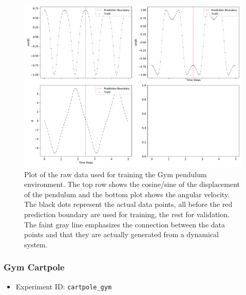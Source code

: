 			\begin{figure}
				\centering
				\includegraphics[width=\linewidth]{figures/experiments/environments/observations-pendulum-gym-N0.pdf}
				\caption{Plot of the raw data used for training the Gym pendulum environment. The top row shows the cosine/sine of the displacement of the pendulum and the bottom plot shows the angular velocity. The black dots represent the actual data points, all before the red prediction boundary are used for training, the rest for validation. The faint gray line emphasizes the connection between the data points and that they are actually generated from a dynamical system.}
				\label{fig:envPendulumGym}
			\end{figure}

		\subsubsection{Gym Cartpole}
			\label{subsubsec:cartpole}

			\begin{itemize}
				\item Experiment ID: \texttt{cartpole\_gym}
			\end{itemize}

